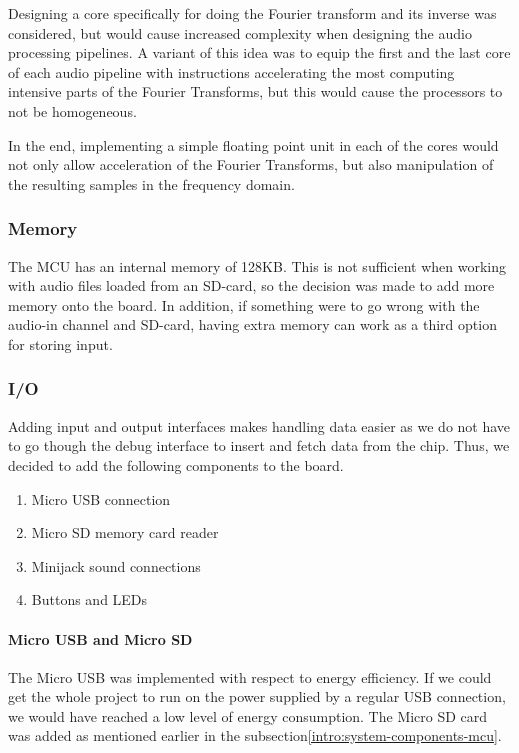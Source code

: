Designing a core specifically for doing the Fourier transform and its inverse
was considered, but would cause increased complexity when designing the audio
processing pipelines. A variant of this idea was to equip the first and the last
core of each audio pipeline with instructions accelerating the most computing
intensive parts of the Fourier Transforms, but this would cause the processors
to not be homogeneous.

In the end, implementing a simple floating point unit in each of the cores
would not only allow acceleration of the Fourier Transforms, but also
manipulation of the resulting samples in the frequency domain.

\subsubsection{Memory}

The MCU has an internal memory of 128KB. This is not sufficient when working
with audio files loaded from an SD-card, so the decision was made to add more
memory onto the board. In addition, if something were to go wrong with the
audio-in channel and SD-card, having extra memory can work as a third option for
storing input.

\subsubsection{I/O}

Adding input and output interfaces makes handling data easier as we do not have
to go though the debug interface to insert and fetch data from the chip. Thus,
we decided to add the following components to the board.

\begin{enumerate}
	\item Micro USB connection
	\item Micro SD memory card reader
	\item Minijack sound connections
	\item Buttons and LEDs
\end{enumerate}

\paragraph{Micro USB and Micro SD}

The Micro USB was implemented with respect to energy efficiency. If we could get
the whole project to run on the power supplied by a regular USB connection, we
would have reached a low level of energy consumption. The Micro SD card was
added as mentioned earlier in the subsection\ref{intro:system-components-mcu}.

